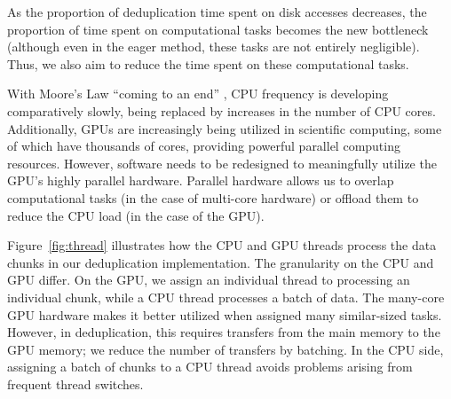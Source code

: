 \documentclass[prodmode,acmtecs]{acmsmall}
\begin{document}
As the proportion of deduplication time spent on disk accesses decreases, the proportion of time spent on computational tasks becomes the new bottleneck (although even in the eager method, these tasks are not entirely negligible).  Thus, we also aim to reduce the time spent on these computational tasks.

With Moore's Law ``coming to an end'' \cite{Waldrop2016}, CPU frequency is developing comparatively slowly, being replaced by increases in the number of CPU cores.  Additionally, GPUs are increasingly being utilized in scientific computing, some of which have thousands of cores, providing powerful parallel computing resources.  However, software needs to be redesigned to meaningfully utilize the GPU's highly parallel hardware.  Parallel hardware allows us to overlap computational tasks (in the case of multi-core hardware) or offload them to reduce the CPU load (in the case of the GPU).

Figure~\ref{fig:thread} illustrates how the CPU and GPU threads process the data chunks in our deduplication implementation.  The granularity on the CPU and GPU differ. On the GPU, we assign an individual thread to processing an individual chunk, while a CPU thread processes a batch of data.  The many-core GPU hardware makes it better utilized when assigned many similar-sized tasks.  However, in deduplication, this requires transfers from the main memory to the GPU memory; we reduce the number of transfers by batching.  In the CPU side, assigning a batch of chunks to a CPU thread avoids problems arising from frequent thread switches.
\end{document}
